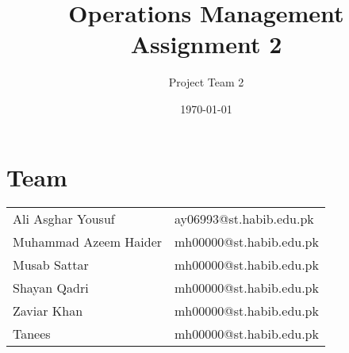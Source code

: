 \documentclass{article}
\title{Operations Management Assignment 2}
\author{Project Team 2}
\date{\today}
\begin{document}
\maketitle
\section*{Team}
\begin{tabular}{ l l }
    Ali Asghar Yousuf & ay06993@st.habib.edu.pk \\
    Muhammad Azeem Haider & mh00000@st.habib.edu.pk \\
    Musab Sattar & mh00000@st.habib.edu.pk \\
    Shayan Qadri & mh00000@st.habib.edu.pk \\
    Zaviar Khan & mh00000@st.habib.edu.pk \\
    Tanees & mh00000@st.habib.edu.pk \\
\end{tabular}
   
\end{document}
